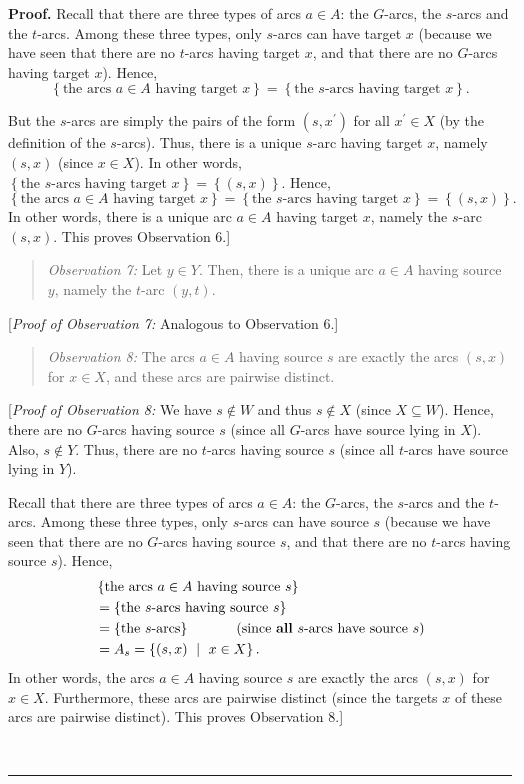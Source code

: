 \documentclass[numbers=enddot,12pt,final,onecolumn,notitlepage]{scrartcl}%
\theoremstyle{definition}
\newenvironment{statement}{\begin{quote}}{\end{quote}}
\newenvironment{proof}[1][Proof]{\noindent\textbf{#1.} }{\ \rule{0.5em}{0.5em}}
\begin{document}
\begin{proof}
Recall that there are three types of arcs $a\in A$: the $G$-arcs, the $s$-arcs
and the $t$-arcs. Among these three types, only $s$-arcs can have target $x$
(because we have seen that there are no $t$-arcs having target $x$, and that
there are no $G$-arcs having target $x$). Hence,%
\[
\left\{  \text{the arcs }a\in A\text{ having target }x\right\}  =\left\{
\text{the }s\text{-arcs having target }x\right\}  .
\]


But the $s$-arcs are simply the pairs of the form $\left(  s,x^{\prime
}\right)  $ for all $x^{\prime}\in X$ (by the definition of the $s$-arcs).
Thus, there is a unique $s$-arc having target $x$, namely $\left(  s,x\right)
$ (since $x\in X$). In other words, $\left\{  \text{the }s\text{-arcs having
target }x\right\}  =\left\{  \left(  s,x\right)  \right\}  $. Hence,%
\[
\left\{  \text{the arcs }a\in A\text{ having target }x\right\}  =\left\{
\text{the }s\text{-arcs having target }x\right\}  =\left\{  \left(
s,x\right)  \right\}  .
\]
In other words, there is a unique arc $a\in A$ having target $x$, namely the
$s$-arc $\left(  s,x\right)  $. This proves Observation 6.]

\begin{statement}
\textit{Observation 7:} Let $y\in Y$. Then, there is a unique arc $a\in A$
having source $y$, namely the $t$-arc $\left(  y,t\right)  $.
\end{statement}

[\textit{Proof of Observation 7:} Analogous to Observation 6.]

\begin{statement}
\textit{Observation 8:} The arcs $a\in A$ having source $s$ are exactly the
arcs $\left(  s,x\right)  $ for $x\in X$, and these arcs are pairwise distinct.
\end{statement}

[\textit{Proof of Observation 8:} We have $s\notin W$ and thus $s\notin X$
(since $X\subseteq W$). Hence, there are no $G$-arcs having source $s$ (since
all $G$-arcs have source lying in $X$). Also, $s\notin Y$. Thus, there are no
$t$-arcs having source $s$ (since all $t$-arcs have source lying in $Y$).

Recall that there are three types of arcs $a\in A$: the $G$-arcs, the $s$-arcs
and the $t$-arcs. Among these three types, only $s$-arcs can have source $s$
(because we have seen that there are no $G$-arcs having source $s$, and that
there are no $t$-arcs having source $s$). Hence,%
\begin{align*}
&  \left\{  \text{the arcs }a\in A\text{ having source }s\right\} \\
&  =\left\{  \text{the }s\text{-arcs having source }s\right\} \\
&  =\left\{  \text{the }s\text{-arcs}\right\}  \ \ \ \ \ \ \ \ \ \ \left(
\text{since \textbf{all} }s\text{-arcs have source }s\right) \\
&  =A_{s}=\left\{  \left(  s,x\right)  \ \mid\ x\in X\right\}  .
\end{align*}
In other words, the arcs $a\in A$ having source $s$ are exactly the arcs
$\left(  s,x\right)  $ for $x\in X$. Furthermore, these arcs are pairwise
distinct (since the targets $x$ of these arcs are pairwise distinct). This
proves Observation 8.]


\end{proof}
\end{document}
